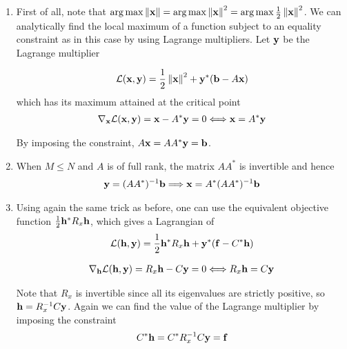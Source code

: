 \documentclass{article}
\begin{document}
    \begin{enumerate}[label=(\roman*)]
        \item First of all, note that $\operatorname*{arg\,max} \left\lVert\mathbf{x}\right\rVert=\operatorname*{arg\,max} \left\lVert\mathbf{x}\right\rVert^2 = \operatorname*{arg\,max} \frac{1}{2}\left\lVert\mathbf{x}\right\rVert^2$. We can analytically find the local maximum of a function subject to an equality constraint as in this case by using Lagrange multipliers. Let $\mathbf{y}$ be the Lagrange multiplier
        
        \begin{align}
            \mathcal{L} (\mathbf{x}, \mathbf{y}) = \frac{1}{2}\left\lVert\mathbf{x}\right\rVert^2 + \mathbf{y}^* (\mathbf{b} - A \mathbf{x})
        \end{align}
        which has its maximum attained at the critical point
        \begin{align}
            \nabla_{\mathbf{x}} \mathcal{L}(\mathbf{x}, \mathbf{y}) = \mathbf{x} - A^* \mathbf{y} = 0 \Longleftrightarrow \mathbf{x} = A^* \mathbf{y}
        \end{align}
        
        By imposing the constraint, $A\mathbf{x}= A A^* \mathbf{y}= \mathbf{b}$.
        \item When $M \leq N$ and $A$ is of full rank, the matrix $A A^*$ is invertible and hence
        \begin{align}
            \mathbf{y} = (A A^*)^{-1} \mathbf{b} \Longrightarrow \mathbf{x} = A^* (A A^*)^{-1} \mathbf{b}
        \end{align}
        \item Using again the same trick as before, one can use the equivalent objective function $\frac{1}{2}\mathbf{h}^* R_x \mathbf{h}$, which gives a Lagrangian of
        \begin{align}
             \mathcal{L} (\mathbf{h}, \mathbf{y}) = \frac{1}{2}\mathbf{h}^* R_x \mathbf{h} + \mathbf{y}^* (\mathbf{f} - C^* \mathbf{h})
        \end{align}
        
        \begin{align}
            \nabla_{\mathbf{h}} \mathcal{L}(\mathbf{h}, \mathbf{y}) = R_x \mathbf{h} - C \mathbf{y} = 0 \Longleftrightarrow R_x \mathbf{h} = C \mathbf{y}
        \end{align}
        
        Note that $R_x$ is invertible since all its eigenvalues are strictly positive, so $\mathbf{h} = R_x^{-1} C \mathbf{y}$. Again we can find the value of the Lagrange multiplier by imposing the constraint
        \begin{align}
            C^* \mathbf{h} = C^* R_x^{-1} C \mathbf{y} = \mathbf{f}
        \end{align}
        

\end{enumerate}
\end{document}
